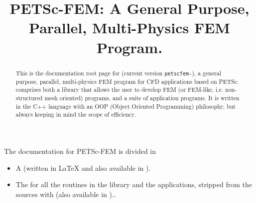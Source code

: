 \documentclass[11pt]{article}
\begin{document}
\sloppy

\title{PETSc-FEM: A General Purpose, Parallel, Multi-Physics FEM Program.}
\maketitle

\begin{abstract}
This is the documentation root page for \pfem (current version 
{\tt petscfem-\petscfemversion}), a general purpose, parallel,
multi-physics FEM program for CFD applications based on
PETSc. \pfem{} comprises both a library that allows the user to
develop FEM (or FEM-like, i.e. non-structured mesh oriented) programs, and
a suite of application programs. It is written in the C++ language
with an OOP (Object Oriented Programming) philosophy, but always
keeping in mind the scope of efficiency. 
\end{abstract}

The documentation for PETSc-FEM is divided in 

\begin{itemize}
\item A  (written
in \LaTeX{} and also available in ).

\item The  for all the routines in the
library and the applications, stripped from the sources with
(also available in )..
\end{itemize}
\end{document}
